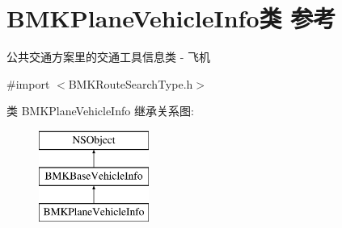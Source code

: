 \hypertarget{interface_b_m_k_plane_vehicle_info}{}\section{B\+M\+K\+Plane\+Vehicle\+Info类 参考}
\label{interface_b_m_k_plane_vehicle_info}


公共交通方案里的交通工具信息类 -\/ 飞机  




{\ttfamily \#import $<$B\+M\+K\+Route\+Search\+Type.\+h$>$}

类 B\+M\+K\+Plane\+Vehicle\+Info 继承关系图\+:\begin{figure}[H]
\begin{center}
\leavevmode
\includegraphics[height=3.000000cm]{interface_b_m_k_plane_vehicle_info}
\end{center}
\end{figure}
